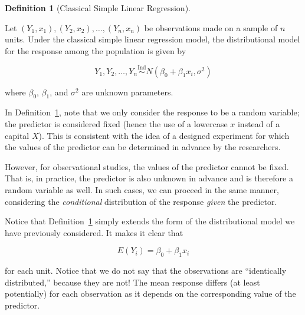 \documentclass[
  letterpaper,
  DIV=11,
  numbers=noendperiod]{scrreprt}
\theoremstyle{plain}
\theoremstyle{definition}
\newtheorem{definition}{Definition}[chapter]
\theoremstyle{definition}
\theoremstyle{remark}
\begin{document}
\begin{definition}[Classical Simple Linear
Regression]\protect\hypertarget{def-classical-simple-regression}{}\label{def-classical-simple-regression}

Let
\(\left(Y_1, x_1\right), \left(Y_2, x_2\right), \dotsc, \left(Y_n, x_n\right)\)
be observations made on a sample of \(n\) units. Under the classical
simple linear regression model, the distributional model for the
response among the population is given by

\[Y_1, Y_2, \dotsc, Y_n \stackrel{\text{Ind}}{\sim} N\left(\beta_0 + \beta_1 x_i, \sigma^2\right)\]

where \(\beta_0\), \(\beta_1\), and \(\sigma^2\) are unknown parameters.

\end{definition}

\begin{tcolorbox}[enhanced jigsaw, toprule=.15mm, left=2mm, title=\textcolor{quarto-callout-note-color}{\faInfo}\hspace{0.5em}{Note}, opacityback=0, toptitle=1mm, leftrule=.75mm, colbacktitle=quarto-callout-note-color!10!white, opacitybacktitle=0.6, titlerule=0mm, breakable, colframe=quarto-callout-note-color-frame, arc=.35mm, coltitle=black, bottomtitle=1mm, rightrule=.15mm, colback=white, bottomrule=.15mm]

In Definition~\ref{def-classical-simple-regression}, note that we only
consider the response to be a random variable; the predictor is
considered fixed (hence the use of a lowercase \(x\) instead of a
capital \(X\)). This is consistent with the idea of a designed
experiment for which the values of the predictor can be determined in
advance by the researchers.

However, for observational studies, the values of the predictor cannot
be fixed. That is, in practice, the predictor is also unknown in advance
and is therefore a random variable as well. In such cases, we can
proceed in the same manner, considering the \emph{conditional}
distribution of the response \emph{given} the predictor.

\end{tcolorbox}

Notice that Definition~\ref{def-classical-simple-regression} simply
extends the form of the distributional model we have previously
considered. It makes it clear that

\[E\left(Y_i\right) = \beta_0 + \beta_1 x_i\]

for each unit. Notice that we do not say that the observations are
``identically distributed,'' because they are not! The mean response
differs (at least potentially) for each observation as it depends on the
corresponding value of the predictor.
\end{document}
